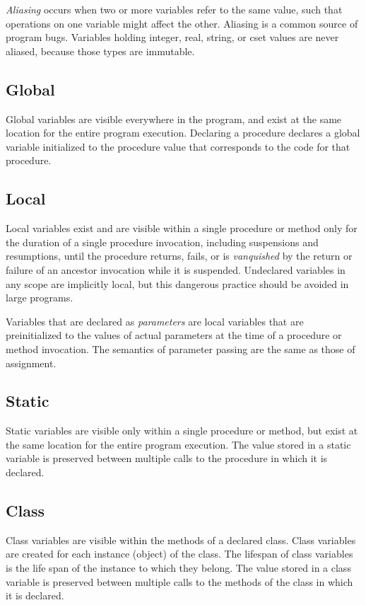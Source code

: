 \textit{Aliasing} occurs when two or more variables
refer to the same value, such that operations on one variable might
affect the other. Aliasing is a common source of program bugs.
Variables holding integer, real, string, or cset values are never
aliased, because those types are immutable.

\subsection*{Global}

Global variables are visible everywhere in the program, and exist at the same
location for the entire program execution. Declaring a procedure declares a
global variable initialized to the procedure value that corresponds to the
code for that procedure.

\subsection*{Local}

Local variables exist and are visible within a single procedure or method only
for the duration of a single procedure invocation, including suspensions and
resumptions, until the procedure returns, fails, or is \textit{vanquished} by
the return or failure of an ancestor invocation while it is suspended.
Undeclared variables in any scope are implicitly local, but this
dangerous practice should be avoided in large programs.

Variables that are declared as \textit{parameters} are local variables
that are preinitialized to the values of actual parameters at the time
of a procedure or method invocation. The semantics of parameter passing
are the same as those of assignment.

\subsection*{Static}

Static variables are visible only within a single procedure or method, but exist
at the same location for the entire program execution. The value stored in a
static variable is preserved between multiple calls to the procedure in which it
is declared.

\subsection*{Class}

Class variables are visible within the methods of a declared class.  Class
variables are created for each instance (object) of the
class. The lifespan of class variables is the life span of the instance to which
they belong. The value stored in a class variable is preserved between multiple
calls to the methods of the class in which it is declared.

